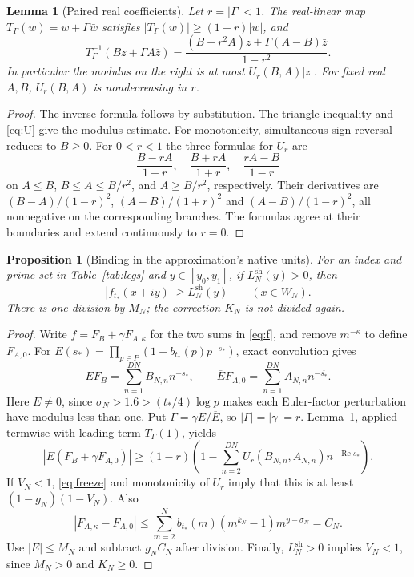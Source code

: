 \documentclass[11pt]{article}
\newtheorem{proposition}[theorem]{Proposition}
\newtheorem{lemma}[theorem]{Lemma}
\theoremstyle{remark}
\newcommand{\tstar}{t_*}
\newcommand{\Lsharp}{L_N^{\mathrm{sh}}}
\DeclareMathOperator{\Rea}{Re}
\numberwithin{equation}{section}
\begin{document}
\begin{lemma}[Paired real coefficients]\label{lem:paired}
Let $r=|\Gamma|<1$. The real-linear map $T_\Gamma(w)=w+\Gamma\bar w$
satisfies $|T_\Gamma(w)|\ge(1-r)|w|$, and
\[
 T_\Gamma^{-1}(Bz+\Gamma A\bar z)
 =\frac{(B-r^2A)z+\Gamma(A-B)\bar z}{1-r^2}.
\]
In particular the modulus on the right is at most $U_r(B,A)|z|$.
For fixed real $A,B$, $U_r(B,A)$ is nondecreasing in $r$.
\end{lemma}
\begin{proof}
The inverse formula follows by substitution. The triangle inequality
and \eqref{eq:U} give the modulus estimate. For monotonicity, simultaneous
sign reversal reduces to $B\ge0$. For $0<r<1$ the three formulas for $U_r$
are
\[
 \frac{B-rA}{1-r},\quad \frac{B+rA}{1+r},\quad\frac{rA-B}{1-r}
\]
on $A\le B$, $B\le A\le B/r^2$, and $A\ge B/r^2$, respectively.
Their derivatives are $(B-A)/(1-r)^2$, $(A-B)/(1+r)^2$ and
$(A-B)/(1-r)^2$, all nonnegative on the corresponding branches.
The formulas agree at their boundaries and extend continuously to $r=0$.
\end{proof}

\begin{proposition}[Binding in the approximation's native units]\label{prop:binding}
For an index and prime set in Table~\ref{tab:legs} and $y\in[y_0,y_1]$,
if $\Lsharp(y)>0$, then
\[
 |f_{\tstar}(x+iy)|\ge\Lsharp(y)\qquad(x\in W_N).
\]
There is one division by $M_N$; the correction $K_N$ is not divided again.
\end{proposition}
\begin{proof}
Write $f=F_B+\gamma F_{A,\kappa}$ for the two sums in \eqref{eq:f},
and remove $m^{-\kappa}$ to define $F_{A,0}$. For
$E(s_*)=\prod_{p\in P}(1-b_{\tstar}(p)p^{-s_*})$, exact convolution gives
\[
 EF_B=\sum_{n=1}^{DN}B_{N,n}n^{-s_*},\qquad
 \overline E F_{A,0}=\sum_{n=1}^{DN}A_{N,n}n^{-\overline{s_*}}.
\]
Here $E\ne0$, since $\sigma_N>1.6>(\tstar/4)\log p$ makes each
Euler-factor perturbation have modulus less than one. Put
$\Gamma=\gamma E/\overline E$, so $|\Gamma|=|\gamma|=r$.
Lemma~\ref{lem:paired}, applied termwise with leading term $T_\Gamma(1)$,
yields
\[
 |E(F_B+\gamma F_{A,0})|
 \ge(1-r)\left(1-\sum_{n=2}^{DN}U_r(B_{N,n},A_{N,n})n^{-\Rea s_*}\right).
\]
If $V_N<1$, \eqref{eq:freeze} and monotonicity of $U_r$ imply that
this is at least $(1-g_N)(1-V_N)$. Also
\[
 |F_{A,\kappa}-F_{A,0}|
 \le\sum_{m=2}^N b_{\tstar}(m)(m^{k_N}-1)m^{y-\sigma_N}=C_N.
\]
Use $|E|\le M_N$ and subtract $g_NC_N$ after division. Finally,
$\Lsharp>0$ implies $V_N<1$, since $M_N>0$ and $K_N\ge0$.
\end{proof}
\end{document}

